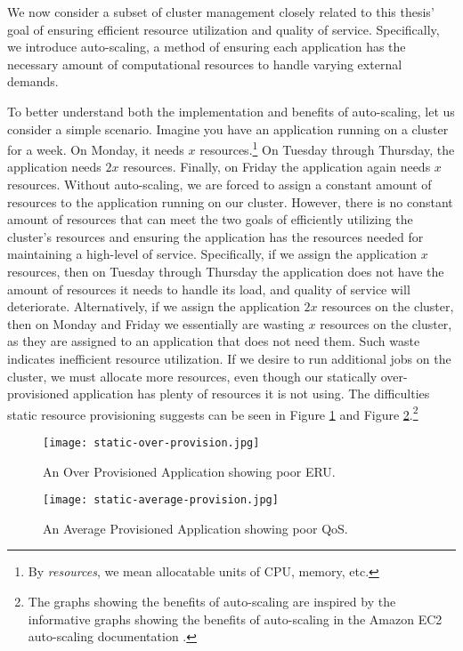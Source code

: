 We now consider a subset of cluster management closely related to
this thesis' goal of ensuring efficient resource utilization and quality of
service. Specifically, we introduce
auto-scaling, a method of ensuring each application has the necessary amount
of computational resources to handle varying external
demands.

To better understand both the implementation and benefits of auto-scaling, let
us consider a simple scenario. Imagine you have an application running on a
cluster for a week. On Monday, it needs $x$ resources.\footnote{By
  \textit{resources}, we mean allocatable units of CPU, memory, etc.} On Tuesday through
Thursday, the application needs $2x$ resources. Finally, on Friday the
application again needs $x$ resources. Without auto-scaling, we are forced
to assign a constant amount of resources to the application running on our
cluster. However, there is no constant amount of resources that can meet
the two goals of efficiently utilizing the cluster's resources and ensuring the
application has the resources needed for maintaining a high-level of service.
Specifically, if we assign the application $x$ resources,
then on Tuesday through Thursday the
application does not have the amount of resources it needs to handle its load,
and quality of service will deteriorate. Alternatively, if we assign the
application $2x$ resources on the cluster, then on Monday and Friday we
essentially are wasting $x$ resources on the cluster, as they are assigned to an
application that does not need them. Such waste indicates inefficient
resource utilization. If we desire to run additional jobs on the cluster, we
must allocate more resources, even though our statically over-provisioned
application has plenty of resources it is not using.
The difficulties static resource provisioning suggests can
be seen in Figure \ref{fig:static-over-provision} and Figure
\ref{fig:static-average-provision}.\footnote{The graphs showing the
  benefits of auto-scaling are inspired by the informative graphs
showing the benefits of auto-scaling in the Amazon EC2 auto-scaling
documentation \cite{amazon-ec2}.}

\begin{figure}[!h]
  \centerline{\texttt{[image: static-over-provision.jpg]}}
  \caption{An Over Provisioned Application showing poor ERU.}
  \label{fig:static-over-provision}
\end{figure}

\begin{figure}[!h]
  \centerline{\texttt{[image: static-average-provision.jpg]}}
  \caption{An Average Provisioned Application showing poor QoS.}
  \label{fig:static-average-provision}
\end{figure}

